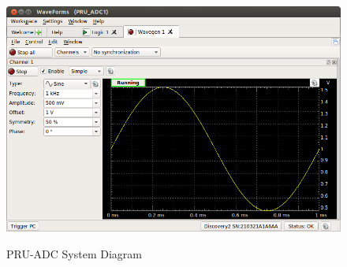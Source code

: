 		\begin{figure}[h]
			\centering
			\includegraphics[width=\textwidth]{photos/discovery2_waveform}
			\centering\bfseries
			\caption{PRU-ADC System Diagram}
		\end{figure}
		
		



	
	

